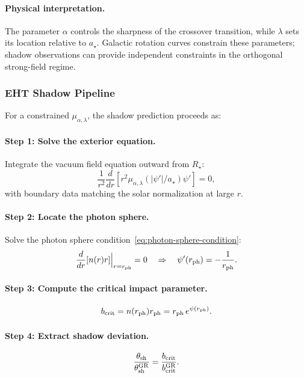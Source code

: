 \paragraph{Physical interpretation.}
The parameter $\alpha$ controls the sharpness of the crossover transition, 
while $\lambda$ sets its location relative to $a_\star$. Galactic rotation 
curves constrain these parameters; shadow observations can provide 
independent constraints in the orthogonal strong-field regime.

\subsubsection{EHT Shadow Pipeline}

For a constrained $\mu_{\alpha,\lambda}$, the shadow prediction proceeds as:

\paragraph{Step 1: Solve the exterior equation.}
Integrate the vacuum field equation outward from $R_\star$:
\begin{equation}
\frac{1}{r^2}\frac{d}{dr}\left[r^2\mu_{\alpha,\lambda}(|\psi'|/a_\star)\psi'\right] = 0,
\end{equation}
with boundary data matching the solar normalization at large $r$.

\paragraph{Step 2: Locate the photon sphere.}
Solve the photon sphere condition~\eqref{eq:photon-sphere-condition}:
\begin{equation}
\frac{d}{dr}[n(r)r]\Big|_{r=r_{\rm ph}} = 0 \quad \Rightarrow \quad \psi'(r_{\rm ph}) = -\frac{1}{r_{\rm ph}}.
\end{equation}

\paragraph{Step 3: Compute the critical impact parameter.}
\begin{equation}
b_{\rm crit} = n(r_{\rm ph})r_{\rm ph} = r_{\rm ph}\,e^{\psi(r_{\rm ph})}.
\end{equation}

\paragraph{Step 4: Extract shadow deviation.}
\begin{equation}
\frac{\theta_{\rm sh}}{\theta_{\rm sh}^{\rm GR}} = \frac{b_{\rm crit}}{b_{\rm crit}^{\rm GR}}.
\end{equation}

